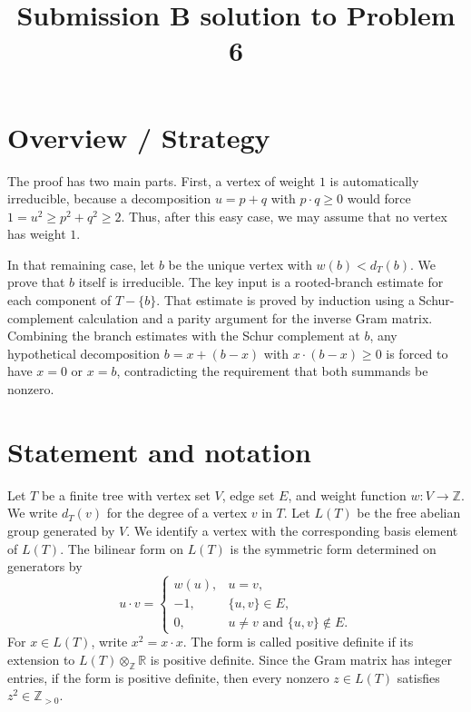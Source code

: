 \documentclass[12pt]{article}
\newcommand{\Z}{\mathbb{Z}}
\begin{document}
\title{Submission B solution to Problem 6}
\date{}
\maketitle


\section*{Overview / Strategy}

The proof has two main parts. First, a vertex of weight \(1\) is automatically irreducible, because a decomposition \(u=p+q\) with \(p\cdot q\ge 0\) would force \(1=u^2\ge p^2+q^2\ge 2\). Thus, after this easy case, we may assume that no vertex has weight \(1\).

In that remaining case, let \(b\) be the unique vertex with \(w(b)<d_T(b)\). We prove that \(b\) itself is irreducible. The key input is a rooted-branch estimate for each component of \(T-\{b\}\). That estimate is proved by induction using a Schur-complement calculation and a parity argument for the inverse Gram matrix. Combining the branch estimates with the Schur complement at \(b\), any hypothetical decomposition \(b=x+(b-x)\) with \(x\cdot(b-x)\ge0\) is forced to have \(x=0\) or \(x=b\), contradicting the requirement that both summands be nonzero.

\section*{Statement and notation}

Let \(T\) be a finite tree with vertex set \(V\), edge set \(E\), and weight function \(w:V\to\Z\). We write \(d_T(v)\) for the degree of a vertex \(v\) in \(T\). Let \(L(T)\) be the free abelian group generated by \(V\). We identify a vertex with the corresponding basis element of \(L(T)\). The bilinear form on \(L(T)\) is the symmetric form determined on generators by
\[
u\cdot v=
\begin{cases}
w(u), & u=v,\\
-1, & \{u,v\}\in E,\\
0, & u\ne v \text{ and } \{u,v\}\notin E.
\end{cases}
\]
For \(x\in L(T)\), write \(x^2=x\cdot x\). The form is called positive definite if its extension to \(L(T)\otimes_{\Z}\mathbb R\) is positive definite. Since the Gram matrix has integer entries, if the form is positive definite, then every nonzero \(z\in L(T)\) satisfies \(z^2\in\Z_{>0}\).
\end{document}
